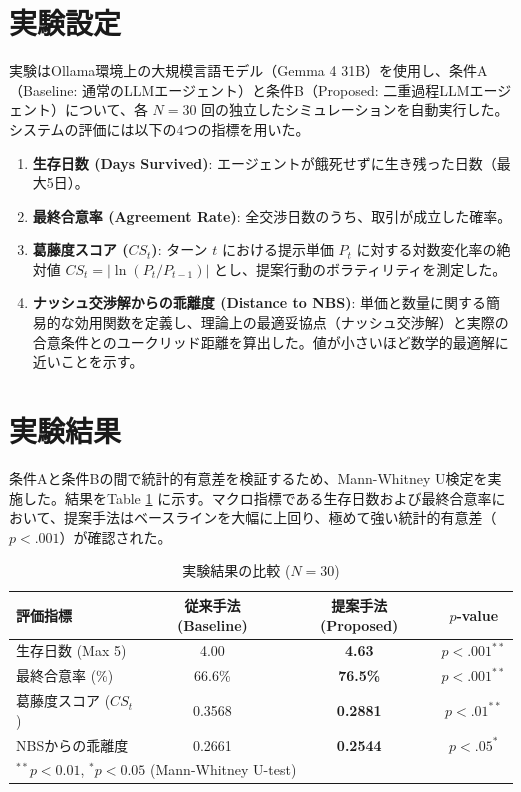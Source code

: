 \documentclass[11pt,a4paper]{ltjsarticle}
\begin{document}
\section{実験設定}
実験はOllama環境上の大規模言語モデル（Gemma 4 31B）を使用し、条件A（Baseline: 通常のLLMエージェント）と条件B（Proposed: 二重過程LLMエージェント）について、各 $N=30$ 回の独立したシミュレーションを自動実行した。
システムの評価には以下の4つの指標を用いた。
\begin{enumerate}
    \item \textbf{生存日数 (Days Survived)}: エージェントが餓死せずに生き残った日数（最大5日）。
    \item \textbf{最終合意率 (Agreement Rate)}: 全交渉日数のうち、取引が成立した確率。
    \item \textbf{葛藤度スコア ($CS_t$)}: ターン $t$ における提示単価 $P_t$ に対する対数変化率の絶対値 $CS_t = \left| \ln(P_t / P_{t-1}) \right|$ とし、提案行動のボラティリティを測定した。
    \item \textbf{ナッシュ交渉解からの乖離度 (Distance to NBS)}: 単価と数量に関する簡易的な効用関数を定義し、理論上の最適妥協点（ナッシュ交渉解）と実際の合意条件とのユークリッド距離を算出した。値が小さいほど数学的最適解に近いことを示す。
\end{enumerate}

\section{実験結果}
条件Aと条件Bの間で統計的有意差を検証するため、Mann-Whitney U検定を実施した。結果をTable \ref{tab:results} に示す。マクロ指標である生存日数および最終合意率において、提案手法はベースラインを大幅に上回り、極めて強い統計的有意差（$p < .001$）が確認された。

\begin{table}[htbp]
\centering
\caption{実験結果の比較 ($N=30$)}
\label{tab:results}
\begin{tabular}{lccc}
\toprule
評価指標 & 従来手法 (Baseline) & 提案手法 (Proposed) & $p$-value \\
\midrule
生存日数 (Max 5) & 4.00 & \textbf{4.63} & $p < .001^{\ast\ast}$ \\
最終合意率 (\%)       & 66.6\% & \textbf{76.5\%} & $p < .001^{\ast\ast}$ \\
葛藤度スコア ($CS_t$) & 0.3568 & \textbf{0.2881} & $p < .01^{\ast\ast}$ \\
NBSからの乖離度 & 0.2661 & \textbf{0.2544} & $p < .05^{\ast} $ \\
\bottomrule
\multicolumn{4}{l}{\small $^{\ast\ast} p < 0.01$, $^{\ast} p < 0.05$ (Mann-Whitney U-test)}
\end{tabular}
\end{table}
\end{document}
